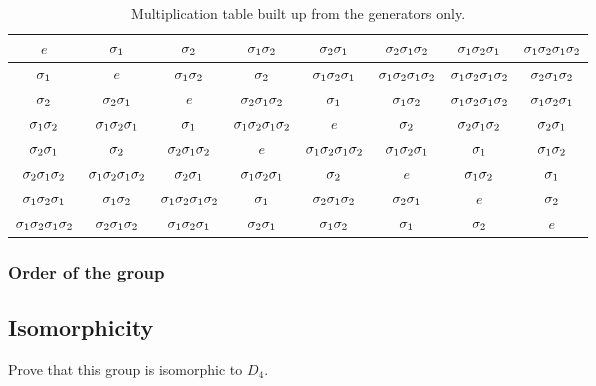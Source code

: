 \documentclass[11pt, english, fleqn, DIV=15, headinclude, BCOR=1cm]{scrartcl}
\begin{document}
\begin{landscape}
    \begin{table}[p]
        \centering
        \begin{tabular}{c|ccccccc}
            $e$ & $\1$ & $\2$ & $\1\2$ & $\2\1$ & $\2\1\2$ & $\1\2\1$ & $\1\2\1\2$ \\
            \midrule
            $\1$ & $e$ & $\1\2$ & $\2$ & $\1\2\1$ & $\1\2\1\2$ & $\1\2\1\2$ & $\2\1\2$ \\
            $\2$ & $\2\1$ & $e$ & $\2\1\2$ & $\1$ & $\1\2$ & $\1\2\1\2$ & $\1\2\1$ \\
            $\1\2$ & $\1\2\1$ & $\1$ & $\1\2\1\2$ & $e$ & $\2$ & $\2\1\2$ & $\2\1$ \\
            $\2\1$ & $\2$ & $\2\1\2$ & $e$ & $\1\2\1\2$ & $\1\2\1$ & $\1$ & $\1\2$ \\
            $\2\1\2$ & $\1\2\1\2$ & $\2\1$ & $\1\2\1$ & $\2$ & $e$ & $\1\2$ & $\1$ \\
            $\1\2\1$ & $\1\2$ & $\1\2\1\2$ & $\1$ & $\2\1\2$ & $\2\1$ & $e$ & $\2$ \\
            $\1\2\1\2$ & $\2\1\2$ & $\1\2\1$ & $\2\1$ & $\1\2$ & $\1$ & $\2$ & $e$ \\
        \end{tabular}
        \caption{%
            Multiplication table built up from the generators only.
        }
        \label{tab:generators}
    \end{table}
\end{landscape}

\subsubsection{Order of the group}

\subsection{Isomorphicity}

\begin{problem}
    Prove that this group is isomorphic to $D_4$.
\end{problem}
\end{document}
